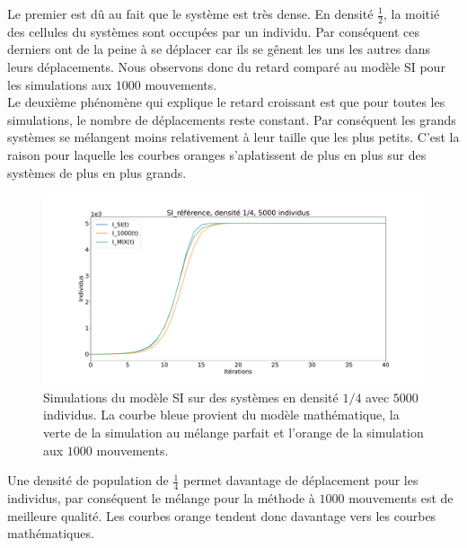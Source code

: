 Le premier est dû au fait que le système est très dense. En densité $\frac{1}{2}$, la moitié des cellules du systèmes sont occupées par un individu. Par conséquent ces derniers ont de la peine à se déplacer car ils se gênent les uns les autres dans leurs déplacements. Nous observons donc du retard comparé au modèle SI pour les simulations aux $1000$ mouvements. \\

Le deuxième phénomène qui explique le retard croissant est que pour toutes les simulations, le nombre de déplacements reste constant. Par conséquent les grands systèmes se mélangent moins relativement à leur taille que les plus petits. C'est la raison pour laquelle les courbes oranges s'aplatissent de plus en plus sur des systèmes de plus en plus grands.\\

\newpage

\begin{figure}[h]
	\centering
	\captionsetup{justification=centering}
	\includegraphics[width=1\textwidth]{Images/SI_ref_4_5k.pdf}
	\caption[Simulations de SI, densité 1/4]{Simulations du modèle SI sur des systèmes en densité $1/4$ avec $5000$ individus. La courbe bleue provient du modèle mathématique, la verte de la simulation au mélange parfait et l'orange de la simulation aux $1000$ mouvements.}
\end{figure}

Une densité de population de $\frac{1}{4}$ permet davantage de déplacement pour les individus, par conséquent le mélange pour la méthode à $1000$ mouvements est de meilleure qualité. Les courbes orange tendent donc davantage vers les courbes mathématiques.

